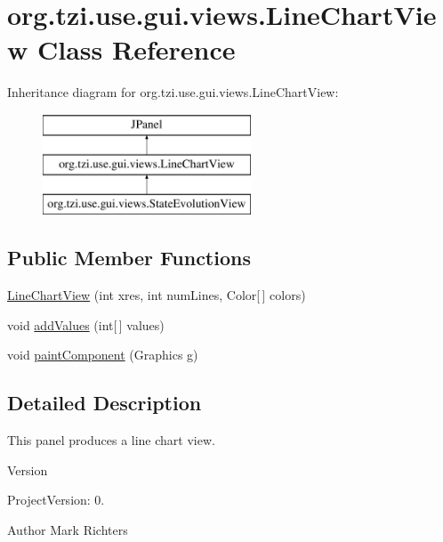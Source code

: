\hypertarget{classorg_1_1tzi_1_1use_1_1gui_1_1views_1_1_line_chart_view}{\section{org.\-tzi.\-use.\-gui.\-views.\-Line\-Chart\-View Class Reference}
\label{classorg_1_1tzi_1_1use_1_1gui_1_1views_1_1_line_chart_view}
}
Inheritance diagram for org.\-tzi.\-use.\-gui.\-views.\-Line\-Chart\-View\-:\begin{figure}[H]
\begin{center}
\leavevmode
\includegraphics[height=3.000000cm]{classorg_1_1tzi_1_1use_1_1gui_1_1views_1_1_line_chart_view}
\end{center}
\end{figure}
\subsection*{Public Member Functions}
\begin{DoxyCompactItemize}
\item 
\hyperlink{classorg_1_1tzi_1_1use_1_1gui_1_1views_1_1_line_chart_view_a9794af57c4f6a2cbeb810196e690d9bb}{Line\-Chart\-View} (int xres, int num\-Lines, Color\mbox{[}$\,$\mbox{]} colors)
\item 
void \hyperlink{classorg_1_1tzi_1_1use_1_1gui_1_1views_1_1_line_chart_view_ade2214883b409a401c289a856c4490b2}{add\-Values} (int\mbox{[}$\,$\mbox{]} values)
\item 
void \hyperlink{classorg_1_1tzi_1_1use_1_1gui_1_1views_1_1_line_chart_view_aba6ceec25bad4cae2b82207b9f1fa74f}{paint\-Component} (Graphics g)
\end{DoxyCompactItemize}


\subsection{Detailed Description}
This panel produces a line chart view.

\begin{DoxyVersion}{Version}

\end{DoxyVersion}
\begin{DoxyParagraph}{Project\-Version\-:}
0. 
\end{DoxyParagraph}
\begin{DoxyAuthor}{Author}
Mark Richters 
\end{DoxyAuthor}


